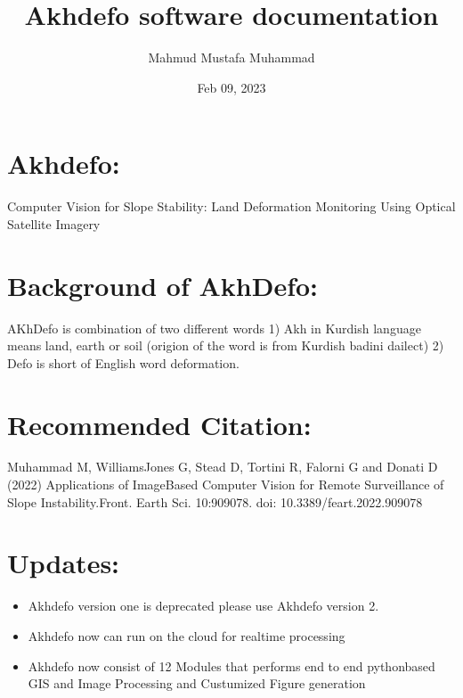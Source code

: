 \documentclass[letterpaper,10pt]{sphinxmanual}
\title{Akhdefo software documentation}
\date{Feb 09, 2023}
\author{Mahmud Mustafa Muhammad}
\begin{document}
\pagestyle{empty}
\cover
\pagestyle{plain}
\sphinxtableofcontents
\pagestyle{normal}
\label{\detokenize{index::doc}}


\sphinxstepscope


\chapter{Akhdefo:}
\label{\detokenize{README:akhdefo}}\label{\detokenize{README::doc}}
\sphinxAtStartPar
Computer Vision for Slope Stability: Land Deformation Monitoring Using Optical Satellite Imagery


\chapter{Background of Akh\sphinxhyphen{}Defo:}
\label{\detokenize{README:background-of-akh-defo}}
\sphinxAtStartPar
AKh\sphinxhyphen{}Defo is combination of two different words 1) Akh in Kurdish language means land, earth or soil (origion of the word is from Kurdish badini dailect) 2) Defo is short of English word deformation.


\chapter{Recommended Citation:}
\label{\detokenize{README:recommended-citation}}
\sphinxAtStartPar
Muhammad M, Williams\sphinxhyphen{}Jones G, Stead D, Tortini R, Falorni G and Donati D (2022) Applications of ImageBased Computer Vision for Remote Surveillance of Slope Instability.Front. Earth Sci. 10:909078. doi: 10.3389/feart.2022.909078


\chapter{Updates:}
\label{\detokenize{README:updates}}\begin{itemize}
\item {} 
\sphinxAtStartPar
Akhdefo version one is deprecated please use Akhdefo version 2.

\item {} 
\sphinxAtStartPar
Akhdefo now can run on the cloud for real\sphinxhyphen{}time processing

\item {} 
\sphinxAtStartPar
Akhdefo now consist of 12 Modules that performs end to end python\sphinxhyphen{}based GIS and Image Processing and Custumized Figure generation

\end{itemize}
\end{document}
